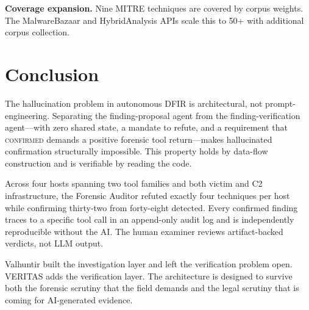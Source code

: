\documentclass[sigconf, nonacm]{acmart}
\begin{document}
\textbf{Coverage expansion.} Nine MITRE techniques are covered by corpus weights.
The MalwareBazaar and HybridAnalysis APIs scale this to 50+ with additional
corpus collection.

\section{Conclusion}

The hallucination problem in autonomous DFIR is architectural, not
prompt-engineering. Separating the finding-proposal agent from the
finding-verification agent---with zero shared state, a mandate to refute, and
a requirement that \textsc{confirmed} demands a positive forensic tool
return---makes hallucinated confirmation structurally impossible. This property
holds by data-flow construction and is verifiable by reading the code.

Across four hosts spanning two tool families and both victim and C2
infrastructure, the Forensic Auditor refuted exactly four techniques per host
while confirming thirty-two from forty-eight detected. Every confirmed finding
traces to a specific tool call in an append-only audit log and is independently
reproducible without the AI. The human examiner reviews artifact-backed
verdicts, not LLM output.

Valhuntir built the investigation layer and left the verification problem open.
VERITAS adds the verification layer. The architecture is designed to survive both
the forensic scrutiny that the field demands and the legal scrutiny that is coming
for AI-generated evidence.



\end{document}
